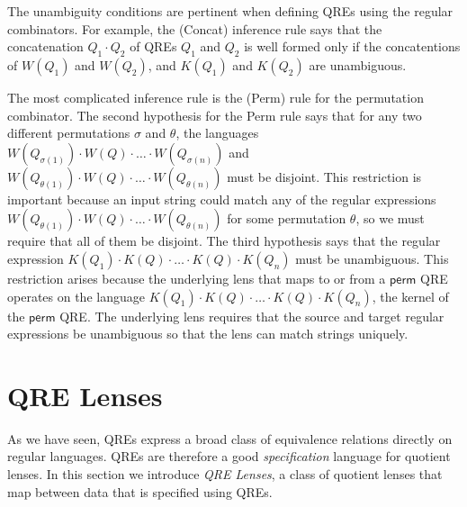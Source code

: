 \documentclass[acmsmall,screen]{acmart}
\newcommand{\kw}[1]{\textcolor{dkblue}{\ensuremath{\mathsf{#1}}}}
\begin{document}
The unambiguity conditions are pertinent when defining QREs using the
regular combinators. For example, the (Concat) inference rule 
says that the concatenation $Q_1 \cdot Q_2$ of QREs
$Q_1$ and $Q_2$ is well formed only if the concatentions of $W(Q_1)$
and $W(Q_2)$, and $K(Q_1)$ and $K(Q_2)$ are unambiguous.

The most complicated inference rule is the (Perm) rule for the
permutation combinator. The second hypothesis for the
Perm rule says that for any two different permutations $\sigma$
and $\theta$, the languages $W(Q_{\sigma(1)}) \cdot W(Q) \cdot \ldots \cdot
W(Q_{\sigma(n)})$ and $W(Q_{\theta(1)}) \cdot W(Q) \cdot \ldots \cdot
W(Q_{\theta(n)})$ must be disjoint. This restriction is important
because an input string could match any
of the regular expressions $W(Q_{\theta(1)}) \cdot
W(Q) \cdot \ldots \cdot W(Q_{\theta(n)})$ for some permutation $\theta$, so we
must require that all of them be disjoint.
%
The third hypothesis says that the regular expression $K(Q_1) \cdot K(Q)
\cdot \ldots \cdot K(Q) \cdot K(Q_n)$ must be unambiguous. This
restriction arises because the
underlying lens that maps to or from a \kw{perm} QRE operates on
the language $K(Q_1) \cdot K(Q) \cdot \ldots \cdot K(Q) \cdot K(Q_n)$, 
the kernel of the \kw{perm} QRE. The underlying
lens requires that the source and target regular expressions be
unambiguous so that the lens can match strings uniquely.


\section{QRE Lenses}
\label{QRE-lenses}
As we have seen, QREs express a broad class of equivalence relations
directly on regular languages. QREs are therefore a good \textit{specification}
language for quotient lenses. In this section we introduce \textit{QRE Lenses},
a class of quotient lenses that map between data that is specified using QREs.
\end{document}
